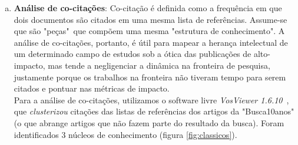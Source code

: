 \documentclass[sigconf]{acmart}
\begin{document}
\begin{enumerate}[a)]
  \item{\textbf{Análise de co-citações}: Co-citação é definida como a frequência em que dois documentos são citados em uma mesma lista de referências. Assume-se que são "peças"~que compõem uma mesma "estrutura de conhecimento".  A análise de co-citações, portanto, é útil para mapear a herança intelectual de um determinado campo de estudos sob a ótica das publicações de alto-impacto, mas tende a negligenciar a dinâmica na fronteira de pesquisa\cite{Vogel2012}, justamente porque os trabalhos na fronteira não tiveram tempo para serem citados e pontuar nas métricas de impacto.\\Para a análise de co-citações, utilizamos o software livre \emph{VosViewer 1.6.10}~\cite{VOSviewer}, que \emph{clusterizou} citações das listas de referências dos artigos da "Busca10anos" (o que abrange artigos que não fazem parte do resultado da busca). Foram identificados 3 núcleos de conhecimento (figura \ref{fig:classicos}).
  }


\end{enumerate}
\end{document}
